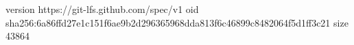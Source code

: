 version https://git-lfs.github.com/spec/v1
oid sha256:6a86ffd27e1c151f6ae9b2d296365968dda813f6c46899c8482064f5d1ff3c21
size 43864
